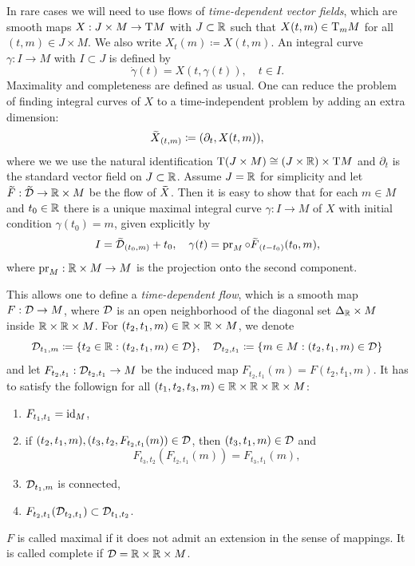 \begin{rem}
    In rare cases we will need to use flows of \emph{time-dependent vector fields}, which are smooth maps $X:J\times M\to \mathrm{T} M$ with $J\subset\mathbb{R}$ such that $X(t,m)\in \mathrm{T}_m M$ for all $(t,m)\in J\times M$. We also write $X_t(m)\coloneqq X(t,m)$. An integral curve $\gamma:I\to M$ with $I\subset J$ is defined by 
    \[\dot\gamma(t)=X(t,\gamma(t)),\quad t\in I.\]
    Maximality and completeness are defined as usual. One can reduce the problem of finding integral curves of $X$ to a time-independent problem by adding an extra dimension:
    \[\wt X_{(t,m)}\coloneqq (\partial_t,X(t,m)),\]
    where we we use the natural identification $\mathrm{T}(J\times M)\cong (J\times\mathbb{R})\times \mathrm{T} M$ and $\partial_t$ is the standard vector field on $J\subset \mathbb{R}$. Assume $J=\mathbb{R}$ for simplicity and let $\wt F:\wt\calD\to \bbR\times M$ be the flow of $\wt X$. Then it is easy to show that for each $m\in M$ and $t_0\in\mathbb{R}$ there is a unique maximal integral curve $\gamma:I\to M$ of $X$ with initial condition $\gamma(t_0)=m$, given explicitly by 
    \[I=\wt{\calD}_{(t_0,m)}+t_0,\quad \gamma(t)=\pr_M\circ \wt{F}_{(t-t_0)}(t_0,m),\]
    where $\operatorname{pr}_M:\mathbb{R}\times M\to M$ is the projection onto the second component.
    
    This allows one to define a \emph{time-dependent flow}, which is a smooth map $F:\mathcal{D}\to M$, where $\mathcal{D}$ is an open neighborhood of the diagonal set $\Delta_{\mathbb{R}}\times M$ inside $\mathbb{R}\times\mathbb{R} \times M$.  For $(t_2,t_1,m)\in\mathbb{R}\times\mathbb{R}\times M$, we denote 
    \[\mathcal{D}_{t_1,m}\coloneqq \{t_2\in\mathbb{R}:(t_2,t_1,m)\in\mathcal{D}\},\quad \mathcal{D}_{t_2,t_1}\coloneqq \{m\in M:(t_2,t_1,m)\in\mathcal{D}\}\]
    and let $F_{t_2,t_1}:\mathcal{D}_{t_2,t_1}\to M$ be the induced map $F_{t_2,t_1}(m)=F(t_2,t_1,m)$. It has to satisfy the followign for all $(t_1,t_2,t_3,m)\in\mathbb{R}\times\mathbb{R}\times\mathbb{R}\times M$:
    \begin{enumerate}
        \item $F_{t_1,t_1}=\operatorname{id}_M$,
        \item if $(t_2,t_1,m),(t_3,t_2,F_{t_2,t_1}(m))\in\mathcal{D}$, then $(t_3,t_1,m)\in\mathcal{D}$ and 
        \[F_{t_3,t_2}(F_{t_2,t_1}(m))=F_{t_3,t_1}(m),\]
        \item $\mathcal{D}_{t_1,m}$ is connected,
        \item $F_{t_2,t_1}(\mathcal{D}_{t_2,t_1})\subset \mathcal{D}_{t_1,t_2}$.
    \end{enumerate}
    $F$ is called maximal if it does not admit an extension in the sense of mappings. It is called complete if $\mathcal{D}=\mathbb{R}\times\mathbb{R}\times M$. 
    

\end{rem}

